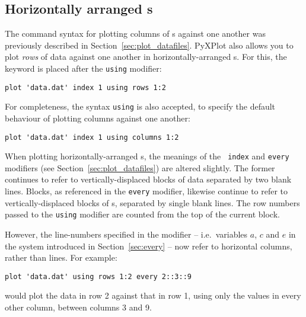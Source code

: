 \subsection{Horizontally arranged \Datafile s}

\label{sec:horizontal_datafiles} The command syntax for plotting
columns of \datafile s against one another was previously described in
Section~\ref{sec:plot_datafiles}. PyXPlot also allows you to plot {\it rows} of
data against one another in horizontally-arranged \datafile s.  For this, the
keyword  is placed after the {\tt using} modifier:

\begin{verbatim}
plot 'data.dat' index 1 using rows 1:2
\end{verbatim}

\noindent For completeness, the syntax {\tt using}  is also
accepted, to specify the default behaviour of plotting columns against one
another:

\begin{verbatim}
plot 'data.dat' index 1 using columns 1:2
\end{verbatim}

When plotting horizontally-arranged \datafile s, the meanings of the {\tt
index} and {\tt every} modifiers (see Section~\ref{sec:plot_datafiles}) are
altered slightly. The former continues to refer to vertically-displaced blocks
of data separated by two blank lines.  Blocks, as referenced in the {\tt every}
modifier, likewise continue to refer to vertically-displaced blocks of
\datapoint s, separated by single blank lines. The row numbers passed to the
{\tt using} modifier are counted from the top of the current block.

However, the line-numbers specified in the  modifier -- i.e.\
variables $a$, $c$ and $e$ in the system introduced in Section~\ref{sec:every}
-- now refer to horizontal columns, rather than lines. For example:

\begin{verbatim}
plot 'data.dat' using rows 1:2 every 2::3::9
\end{verbatim}

\noindent would plot the data in row 2 against that in row 1, using only the
values in every other column, between columns 3 and 9.

